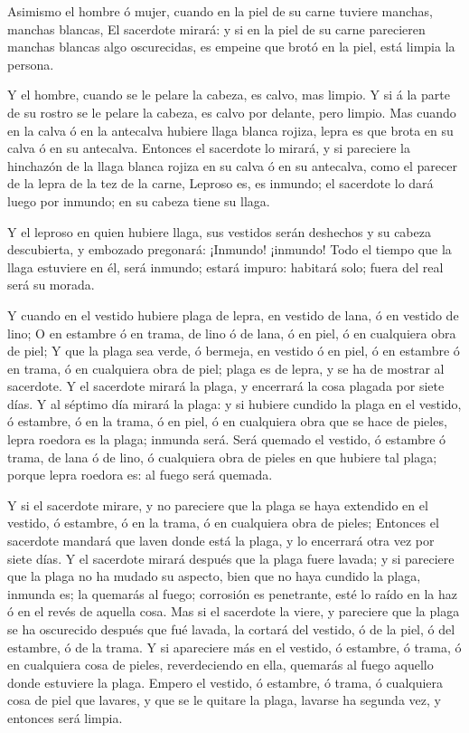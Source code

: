  Asimismo el hombre ó mujer, cuando en la piel de su carne
tuviere manchas, manchas blancas,  El sacerdote mirará: y
si en la piel de su carne parecieren manchas blancas algo oscurecidas,
es empeine que brotó en la piel, está limpia la persona.

 Y el hombre, cuando se le pelare la cabeza, es calvo, mas
limpio.  Y si á la parte de su rostro se le pelare la
cabeza, es calvo por delante, pero limpio.  Mas cuando en
la calva ó en la antecalva hubiere llaga blanca rojiza, lepra es que
brota en su calva ó en su antecalva.  Entonces el sacerdote
lo mirará, y si pareciere la hinchazón de la llaga blanca rojiza en su
calva ó en su antecalva, como el parecer de la lepra de la tez de la
carne,  Leproso es, es inmundo; el sacerdote lo dará luego
por inmundo; en su cabeza tiene su llaga.

 Y el leproso en quien hubiere llaga, sus vestidos serán
deshechos y su cabeza descubierta, y embozado pregonará: ¡Inmundo!
¡inmundo!  Todo el tiempo que la llaga estuviere en él,
será inmundo; estará impuro: habitará solo; fuera del real será su
morada.

 Y cuando en el vestido hubiere plaga de lepra, en vestido
de lana, ó en vestido de lino;  O en estambre ó en trama,
de lino ó de lana, ó en piel, ó en cualquiera obra de piel;
 Y que la plaga sea verde, ó bermeja, en vestido ó en piel,
ó en estambre ó en trama, ó en cualquiera obra de piel; plaga es de
lepra, y se ha de mostrar al sacerdote.  Y el sacerdote
mirará la plaga, y encerrará la cosa plagada por siete días.
 Y al séptimo día mirará la plaga: y si hubiere cundido la
plaga en el vestido, ó estambre, ó en la trama, ó en piel, ó en
cualquiera obra que se hace de pieles, lepra roedora es la plaga;
inmunda será.  Será quemado el vestido, ó estambre ó trama,
de lana ó de lino, ó cualquiera obra de pieles en que hubiere tal plaga;
porque lepra roedora es: al fuego será quemada.

 Y si el sacerdote mirare, y no pareciere que la plaga se
haya extendido en el vestido, ó estambre, ó en la trama, ó en cualquiera
obra de pieles;  Entonces el sacerdote mandará que laven
donde está la plaga, y lo encerrará otra vez por siete días.
 Y el sacerdote mirará después que la plaga fuere lavada; y
si pareciere que la plaga no ha mudado su aspecto, bien que no haya
cundido la plaga, inmunda es; la quemarás al fuego; corrosión es
penetrante, esté lo raído en la haz ó en el revés de aquella cosa.
 Mas si el sacerdote la viere, y pareciere que la plaga se
ha oscurecido después que fué lavada, la cortará del vestido, ó de la
piel, ó del estambre, ó de la trama.  Y si apareciere más
en el vestido, ó estambre, ó trama, ó en cualquiera cosa de pieles,
reverdeciendo en ella, quemarás al fuego aquello donde estuviere la
plaga.  Empero el vestido, ó estambre, ó trama, ó
cualquiera cosa de piel que lavares, y que se le quitare la plaga,
lavarse ha segunda vez, y entonces será limpia.

